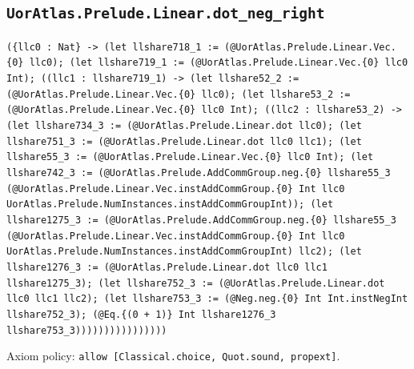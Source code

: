 \documentclass[11pt]{article}
\begin{document}
\subsection*{\texttt{UorAtlas.Prelude.Linear.dot\_neg\_right}}
\noindent\texttt{(\{llc0 : Nat\} -> (let llshare718\_1 := (@UorAtlas.Prelude.Linear.Vec.\{0\} llc0); (let llshare719\_1 := (@UorAtlas.Prelude.Linear.Vec.\{0\} llc0 Int); ((llc1 : llshare719\_1) -> (let llshare52\_2 := (@UorAtlas.Prelude.Linear.Vec.\{0\} llc0); (let llshare53\_2 := (@UorAtlas.Prelude.Linear.Vec.\{0\} llc0 Int); ((llc2 : llshare53\_2) -> (let llshare734\_3 := (@UorAtlas.Prelude.Linear.dot llc0); (let llshare751\_3 := (@UorAtlas.Prelude.Linear.dot llc0 llc1); (let llshare55\_3 := (@UorAtlas.Prelude.Linear.Vec.\{0\} llc0 Int); (let llshare742\_3 := (@UorAtlas.Prelude.AddCommGroup.neg.\{0\} llshare55\_3 (@UorAtlas.Prelude.Linear.Vec.instAddCommGroup.\{0\} Int llc0 UorAtlas.Prelude.NumInstances.instAddCommGroupInt)); (let llshare1275\_3 := (@UorAtlas.Prelude.AddCommGroup.neg.\{0\} llshare55\_3 (@UorAtlas.Prelude.Linear.Vec.instAddCommGroup.\{0\} Int llc0 UorAtlas.Prelude.NumInstances.instAddCommGroupInt) llc2); (let llshare1276\_3 := (@UorAtlas.Prelude.Linear.dot llc0 llc1 llshare1275\_3); (let llshare752\_3 := (@UorAtlas.Prelude.Linear.dot llc0 llc1 llc2); (let llshare753\_3 := (@Neg.neg.\{0\} Int Int.instNegInt llshare752\_3); (@Eq.\{(0 + 1)\} Int llshare1276\_3 llshare753\_3))))))))))))))))}\par
\noindent Axiom policy: \texttt{allow [Classical.choice, Quot.sound, propext]}.\par
\end{document}
